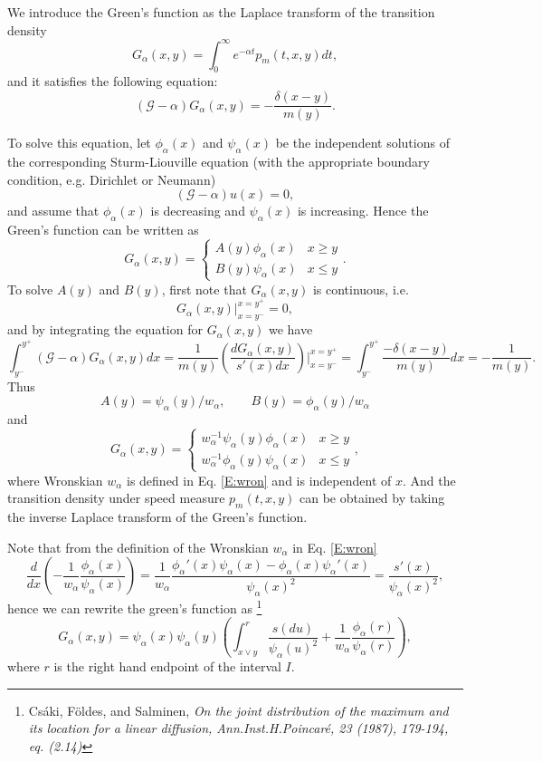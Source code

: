 We introduce the Green's function as the Laplace transform of the transition
density
\begin{equation}
  G_{\alpha}(x,y) = \int_0^{\infty} e^{-\alpha t} p_m(t,x,y) dt,
\end{equation}
and it satisfies the following equation:
\begin{equation}
  (\mathcal{G} - \alpha) G_{\alpha}(x,y) = -\frac{\delta(x-y)}{m(y)}.
\end{equation}

To solve this equation, let $\phi_{\alpha}(x)$ and $\psi_{\alpha}(x)$ be the
independent solutions of the corresponding Sturm-Liouville equation
(with the appropriate boundary condition, e.g. Dirichlet or Neumann)
\[
  (\mathcal{G} - \alpha) u(x) = 0,
\]
and assume that $\phi_{\alpha}(x)$ is decreasing and $\psi_{\alpha}(x)$ is
increasing. Hence the Green's function can be written as
\[
  G_{\alpha}(x,y) = 
    \begin{cases}
      A(y) \phi_{\alpha}(x)   & x \ge y \\
      B(y) \psi_{\alpha}(x)   & x \le y 
    \end{cases}.
\]
To solve $A(y)$ and $B(y)$, first note that $G_{\alpha}(x,y)$ is continuous,
i.e.
\[
  G_{\alpha}(x,y)\big|_{x=y^-}^{x=y^+} = 0,
\]
and by integrating the equation for $G_{\alpha}(x,y)$ we have
\[
  \int_{y^-}^{y^+} (\mathcal{G}-\alpha) G_{\alpha}(x,y) dx
    = \frac{1}{m(y)} \left( \frac{dG_{\alpha}(x,y)}{s'(x)dx} \right)
      \bigg|_{x=y^-}^{x=y^+} 
    = \int_{y^-}^{y^+} \frac{-\delta(x-y)}{m(y)} dx = -\frac{1}{m(y)}.
\]
Thus 
\[
  A(y)=\psi_{\alpha}(y)/w_{\alpha}, \qquad B(y)=\phi_{\alpha}(y)/w_{\alpha}
\]
and
\begin{equation}
  G_{\alpha}(x,y) = 
    \begin{cases}
      w_{\alpha}^{-1} \psi_{\alpha}(y) \phi_{\alpha}(x)   & x \ge y \\
      w_{\alpha}^{-1} \phi_{\alpha}(y) \psi_{\alpha}(x)   & x \le y 
    \end{cases},
\end{equation}
where Wronskian $w_{\alpha}$ is defined in Eq. \ref{E:wron} and is independent
of $x$. And the transition density under speed measure $p_m(t,x,y)$ can be 
obtained by taking the inverse Laplace transform of the Green's function.

Note that from the definition of the Wronskian $w_{\alpha}$ in Eq. \ref{E:wron}
\[
	\frac{d}{dx} \left( - \frac{1}{w_{\alpha}}
	\frac{\phi_{\alpha}(x)}{\psi_{\alpha}(x)} \right)
	= \frac{1}{w_{\alpha}} \frac{\phi_{\alpha}'(x)\psi_{\alpha}(x) -
	\phi_{\alpha}(x)\psi_{\alpha}'(x)}{\psi_{\alpha}(x)^2}
	= \frac{s'(x)}{\psi_{\alpha}(x)^2},
\]
hence we can rewrite the green's function as
\footnote{Cs\'{a}ki, F\"{o}ldes, and Salminen, \it{On the joint distribution of
	the maximum and its location for a linear diffusion},
        Ann.Inst.H.Poincar\'{e}, 23 (1987), 179-194, eq. (2.14)}
\begin{equation}
  G_{\alpha}(x,y) 
  = \psi_{\alpha}(x) \psi_{\alpha}(y) 
  \left( \int_{x\vee y}^r \frac{s(du)}{\psi_{\alpha}(u)^2} 
	  + \frac{1}{w_{\alpha}} \frac{\phi_{\alpha}(r)}{\psi_{\alpha}(r)} 
      \right),
\end{equation}
where $r$ is the right hand endpoint of the interval $I$.

